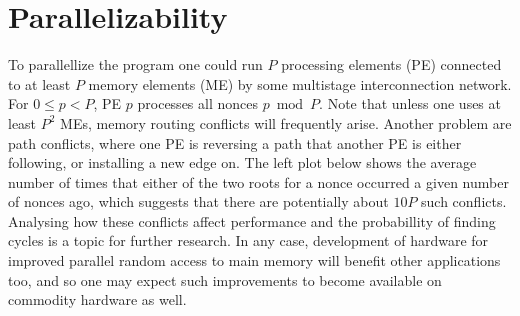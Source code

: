 \documentclass[11pt, oneside]{article}
\begin{document}
\section{Parallelizability}
To parallellize the program one could run $P$ processing elements (PE) connected to at least $P$ memory elements (ME)
by some multistage interconnection network.
For $0\leq p < P$, PE $p$ processes all nonces $p \bmod P$.
Note that unless one uses at least $P^2$ MEs, memory routing conflicts will frequently arise.
Another problem are path conflicts, where one PE is reversing a path that another PE
is either following, or installing a new edge on. The left plot below shows the average number of times that either of
the two roots
for a nonce occurred a given number of nonces ago, which suggests that there are potentially about $10P$ such conflicts.
Analysing how these conflicts affect performance and the probabillity of finding cycles is a topic for further research. 
In any case, development of hardware for improved parallel random access to main memory will benefit
other applications too, and so one may expect such improvements to become available on commodity hardware as well.
\end{document}
